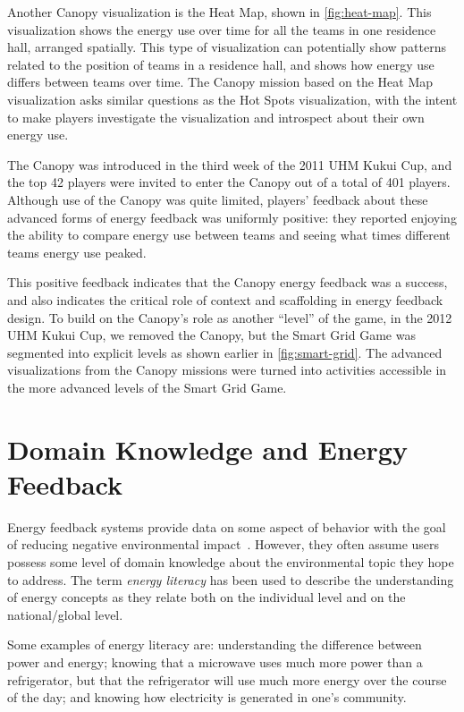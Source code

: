 \documentclass[10pt, conference, compsocconf]{IEEEtran-old}
\begin{document}
Another Canopy visualization is the Heat Map, shown in \autoref{fig:heat-map}. This visualization shows the energy use over time for all the teams in one residence hall, arranged spatially. This type of visualization can potentially show patterns related to the position of teams in a residence hall, and shows how energy use differs between teams over time. The Canopy mission based on the Heat Map visualization asks similar questions as the Hot Spots visualization, with the intent to make players investigate the visualization and introspect about their own energy use.

The Canopy was introduced in the third week of the 2011 UHM Kukui Cup, and the top 42 players were invited to enter the Canopy out of a total of 401 players. Although use of the Canopy was quite limited, players' feedback about these advanced forms of energy feedback was uniformly positive: they reported enjoying the ability to compare energy use between teams and seeing what times different teams energy use peaked.

This positive feedback indicates that the Canopy energy feedback was a success, and also indicates the critical role of context and scaffolding in energy feedback design. To build on the Canopy's role as another ``level'' of the game, in the 2012 UHM Kukui Cup, we removed the Canopy, but the Smart Grid Game was segmented into explicit levels as shown earlier in \autoref{fig:smart-grid}. The advanced visualizations from the Canopy missions were turned into activities accessible in the more advanced levels of the Smart Grid Game.


\section{Domain Knowledge and Energy Feedback}

Energy feedback systems provide data on some aspect of behavior with the goal of reducing negative environmental impact~\cite{Froehlich2010}. However, they often assume users possess some level of domain knowledge about the environmental topic they hope to address. The term \emph{energy literacy} has been used to describe the understanding of energy concepts as they relate both on the individual level and on the national/global level.

Some examples of energy literacy are: understanding the difference between power and energy; knowing that a microwave uses much more power than a refrigerator, but that the refrigerator will use much more energy over the course of the day; and knowing how electricity is generated in one's community.
\end{document}
